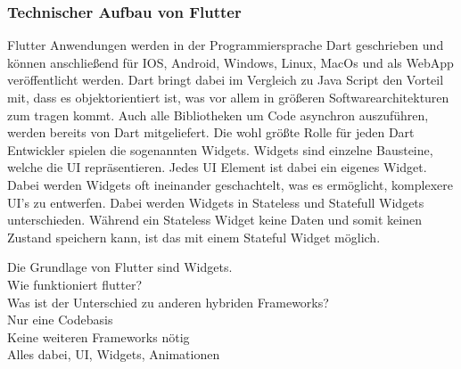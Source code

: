 \subsubsection{Technischer Aufbau von Flutter}
Flutter Anwendungen werden in der Programmiersprache Dart geschrieben und können anschließend für IOS, Android, Windows, Linux, MacOs und als WebApp 
veröffentlicht werden. Dart bringt dabei im Vergleich zu Java Script den Vorteil mit, dass es objektorientiert ist, was vor allem in größeren 
Softwarearchitekturen zum tragen kommt. Auch alle Bibliotheken um Code asynchron auszuführen, werden bereits von Dart mitgeliefert. 
Die wohl größte Rolle für jeden Dart Entwickler spielen die sogenannten Widgets. Widgets sind einzelne Bausteine, welche die UI repräsentieren. 
Jedes UI Element ist dabei ein eigenes Widget. Dabei werden Widgets oft ineinander geschachtelt, was es ermöglicht, komplexere UI’s zu entwerfen. 
Dabei werden Widgets in Stateless und Statefull Widgets unterschieden. Während ein Stateless Widget keine Daten und somit keinen Zustand speichern kann, 
ist das mit einem Stateful Widget möglich.

Die Grundlage von Flutter sind Widgets. \\
Wie funktioniert flutter?   \\
Was ist der Unterschied zu anderen hybriden Frameworks?  \\ 
Nur eine Codebasis \\
Keine weiteren Frameworks nötig\\
Alles dabei, UI, Widgets, Animationen\\

